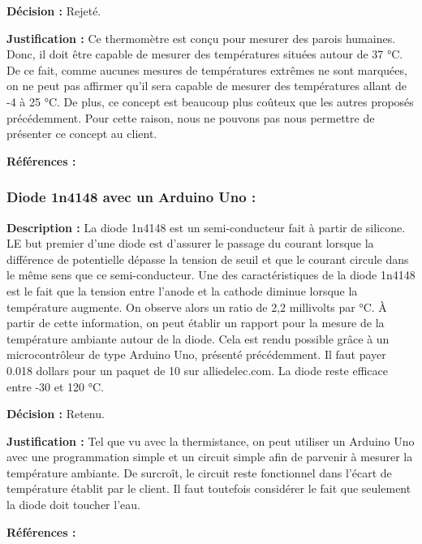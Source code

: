 \textbf{Décision :} Rejeté.

\textbf{Justification :} Ce thermomètre est conçu pour mesurer des parois humaines. Donc, il doit être capable de mesurer des températures situées autour de 37 °C. De ce fait, comme aucunes mesures de températures extrêmes ne sont marquées, on ne peut pas affirmer qu’il sera capable de mesurer des températures allant de -4 à 25 °C. De plus, ce concept est beaucoup plus coûteux que les autres proposés précédemment. Pour cette raison, nous ne pouvons pas nous permettre de présenter ce concept au client. 

\textbf{Références :} \cite{Thermo}

\subsubsection{Diode 1n4148 avec un Arduino Uno : }
\label{1n4}

\textbf{ Description :} La diode 1n4148 est un semi-conducteur fait à partir de silicone. LE but premier d’une diode est d’assurer le passage du courant lorsque la différence de potentielle dépasse la tension de seuil et que le courant circule dans le même sens que ce semi-conducteur. Une des caractéristiques de la diode 1n4148 est le fait que la tension entre l’anode et la cathode diminue lorsque la température augmente. On observe alors un ratio de 2,2 millivolts par °C. À partir de cette information, on peut établir un rapport pour la mesure de la température ambiante autour de la diode. Cela est rendu possible grâce à un microcontrôleur de type Arduino Uno, présenté précédemment. Il faut payer 0.018 dollars pour un paquet de 10 sur alliedelec.com. La diode reste efficace entre -30 et 120 °C.

\textbf{Décision :} Retenu.

\textbf{Justification :} Tel que vu avec la thermistance, on peut utiliser un Arduino Uno avec une programmation simple et un circuit simple afin de parvenir à mesurer la température ambiante. De surcroît, le circuit reste fonctionnel dans l’écart de température établit par le client. Il faut toutefois considérer le fait que seulement la diode doit toucher l'eau.

\textbf{Références :} \cite{Allie} \cite{Tu1n}  \cite{Da1n}

